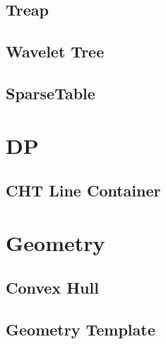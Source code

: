 \subsection{Treap}
\vspace{-2ex}
\raggedbottom
\vspace{-3.2ex}
\hrulefill
\subsection{Wavelet Tree}
\vspace{-2ex}
\raggedbottom
\vspace{-3.2ex}
\hrulefill
\subsection{SparseTable}
\vspace{-2ex}
\raggedbottom
\vspace{-3.2ex}
\hrulefill

\section{DP}
\subsection{CHT Line Container}
\vspace{-2ex}
\raggedbottom
\vspace{-3.2ex}
\hrulefill

\section{Geometry}
\subsection{Convex Hull}
\vspace{-2ex}
\raggedbottom
\vspace{-3.2ex}
\hrulefill
\subsection{Geometry Template}
\vspace{-2ex}
\raggedbottom
\vspace{-3.2ex}
\hrulefill
